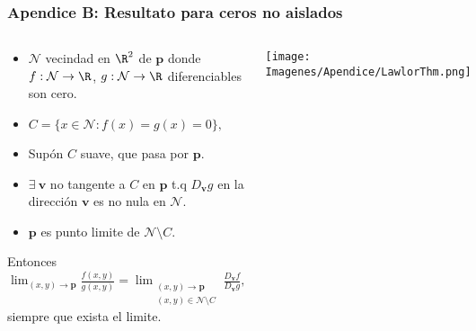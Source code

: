 \begin{frame}[label=ZerosConditions, noframenumbering]
    \frametitle{Apendice B: Resultato para ceros no aislados}    
    \begin{columns}
            \begin{Teorema} 
                \begin{itemize}
                    \item 
                        $\mathcal{N}$ vecindad en $\R^2$ de $\mathbf{p}$ donde
                        $f:\mathcal{N}\to \R$,  
                        $g:\mathcal{N}\to \R$ diferenciables son cero. 
                    \item
                        $
                            C=\{x \in \mathcal{N}: f(x)=g(x)=0 \},
                        $               
                    \item
                        Supón $C$ suave, que pasa por $\mathbf{p}$.
                    \item
                     $\exists \ \mathbf{v}$ no tangente a $C$ en $\mathbf{p}$
                        t.q  $D_{\mathbf{v}}g$ en la dirección $\mathbf{v}$ es 
no nula en
                        $\mathcal{N}$.
                    \item
                        $\mathbf{p}$ es punto limite de $\mathcal{N}\setminus 
C$. 
            \end{itemize}
        Entonces
                $
                    \displaystyle
                    \lim_{(x,y)\to \mathbf{p}}
                    \frac{f(x,y)}{g(x,y)} =
                    \lim_{
                        \substack{
                            (x,y)\to \mathbf{p}\\ 
                            (x,y)\in \mathcal{N} \setminus C
                        }
                    }
                    \frac{D_{\mathbf{v}} f }{D_{\mathbf{v}} g},
                $
                siempre que exista el limite.
            \end{Teorema}
                
\texttt{[image: Imagenes/Apendice/LawlorThm.png]}
                \\
                \hyperlink{Construccion<6>}{}
                \begin{bibunit}[alpha]
                    \nocite{Lawlor2012}
                \end{bibunit}
    \end{columns}
\end{frame}
